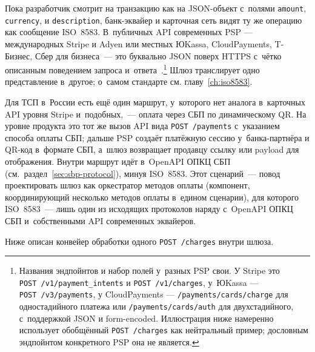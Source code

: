 Пока разработчик смотрит на транзакцию как на JSON-объект
с~полями \texttt{amount}, \texttt{currency},
 и \texttt{description}, банк-эквайер
и карточная сеть видят ту же операцию как сообщение
ISO~8583. В~публичных API современных PSP --- международных
Stripe и Adyen или местных ЮKassa, CloudPayments, T-Бизнес,
Сбер для бизнеса~--- это буквально JSON поверх HTTPS с~чётко
описанным поведением запроса и~ответа~\cite{stripe-api-reference,yookassa-api,cloudpayments-api}.\footnote{Названия
эндпойнтов и набор полей у~разных PSP свои. У Stripe это
\texttt{POST~/v1/payment\_intents} и \texttt{POST~/v1/charges},
у~ЮKassa --- \texttt{POST~/v3/payments}, у CloudPayments ---
\texttt{/payments/cards/charge} для одностадийного платежа или
\texttt{/payments/cards/auth} для двухстадийного, с~поддержкой
JSON и form-encoded.
Иллюстрация ниже намеренно использует обобщённый
\texttt{POST~/charges} как нейтральный пример; дословным
эндпойнтом конкретного PSP она не является.} Шлюз транслирует одно
представление в~другое; о~самом стандарте см.
главу~\ref{ch:iso8583}.

Для ТСП в~России есть ещё один маршрут, у~которого нет аналога
в~карточных API уровня Stripe и~подобных,~--- оплата через СБП по динамическому
QR. На уровне продукта это тот же вызов API вида
\texttt{POST~/payments} с~указанием способа оплаты СБП;
дальше PSP создаёт платёжную сессию у~банка-партнёра и QR-код
в~формате СБП, а~шлюз возвращает продавцу ссылку или payload
для отображения. Внутри маршрут идёт в~OpenAPI ОПКЦ СБП
(см.~раздел~\ref{sec:sbp-protocol}), минуя ISO~8583. Этот сценарий~---
повод проектировать шлюз как оркестратор методов оплаты
(компонент, координирующий несколько методов оплаты в~едином
сценарии), для которого ISO~8583~--- лишь один из исходящих
протоколов наряду с~OpenAPI ОПКЦ СБП и~собственными API
современных эквайеров.

Ниже описан конвейер обработки одного \texttt{POST~/charges} внутри шлюза.

